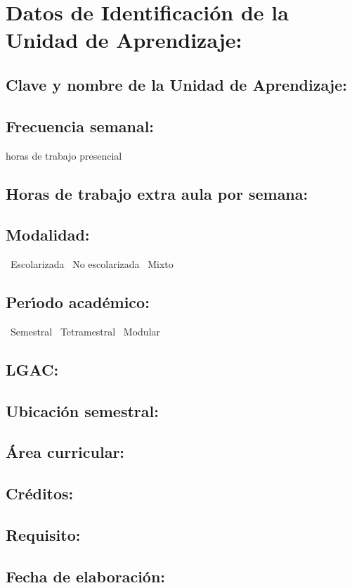 \documentclass[10 pt]{article}
\begin{document}


\section{Datos de Identificaci\'{o}n de la Unidad de Aprendizaje:}
\subsection{Clave y nombre de la Unidad de Aprendizaje:} 
\subsection{Frecuencia semanal:} horas de trabajo presencial 
\subsection{Horas de trabajo extra aula por semana:} 
\subsection{Modalidad:} \yes~Escolarizada \no~No escolarizada \no~Mixto
\subsection{Per\'{\i}odo acad\'{e}mico:} \yes~Semestral
\no~Tetramestral \no~Modular
\subsection{LGAC:} \underline{\odsi}
\subsection{Ubicaci\'{o}n semestral:} 
\subsection{\'{A}rea curricular:} \underline{\pi}
\subsection{Cr\'{e}ditos:} 
\subsection{Requisito:} 
\subsection{Fecha de elaboraci\'{o}n:} 
\end{document}
